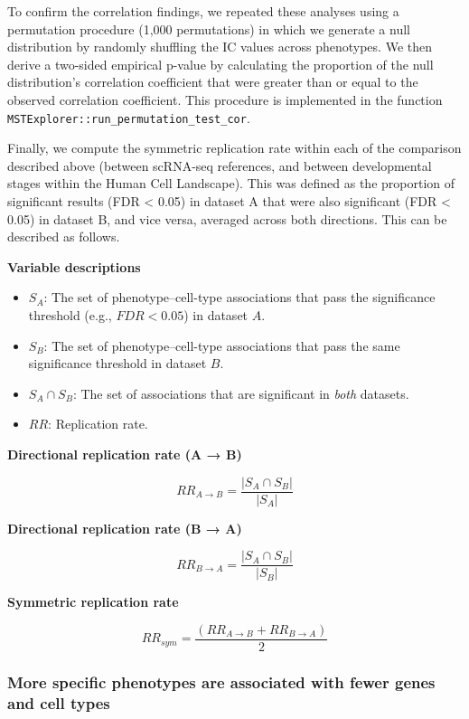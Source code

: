 \documentclass[
]{article}
\begin{document}
To confirm the correlation findings, we repeated these analyses using a
permutation procedure (1,000 permutations) in which we generate a null
distribution by randomly shuffling the IC values across phenotypes. We
then derive a two-sided empirical p-value by calculating the proportion
of the null distribution's correlation coefficient that were greater
than or equal to the observed correlation coefficient. This procedure is
implemented in the function
\texttt{MSTExplorer::run\_permutation\_test\_cor}.

Finally, we compute the symmetric replication rate within each of the
comparison described above (between scRNA-seq references, and between
developmental stages within the Human Cell Landscape). This was defined
as the proportion of significant results (FDR \textless{} 0.05) in
dataset A that were also significant (FDR \textless{} 0.05) in dataset
B, and vice versa, averaged across both directions. This can be
described as follows.

\textbf{Variable descriptions}

\begin{itemize}
\item
  \(S_{A}\): The set of phenotype--cell-type associations that pass the
  significance threshold (e.g., \(FDR < 0.05\)) in dataset \(A\).
\item
  \(S_{B}\): The set of phenotype--cell-type associations that pass the
  same significance threshold in dataset \(B\).
\item
  \(S_{A} \cap S_{B}\): The set of associations that are significant in
  \emph{both} datasets.
\item
  \(RR\): Replication rate.
\end{itemize}

\textbf{Directional replication rate (A → B)}

\[ 
RR_{A \rightarrow B}
=
\frac{
\left| 
S_{A} \cap S_{B}
\right|
}{
\left|
S_{A}
\right|
}
\]

\textbf{Directional replication rate (B → A)}

\[
RR_{B \rightarrow A}
=
\frac{
\left| 
S_{A} \cap S_{B}
\right|
}{
\left|
S_{B}
\right|
}
\]

\textbf{Symmetric replication rate}

\[
RR_{sym} 
=
\frac{
\left(
        RR_{A \rightarrow B}
        +
            RR_{B \rightarrow A}
        \right)
}{2}
\]

\subsubsection{More specific phenotypes are associated with fewer genes
and cell
types}\label{more-specific-phenotypes-are-associated-with-fewer-genes-and-cell-types}
\end{document}
